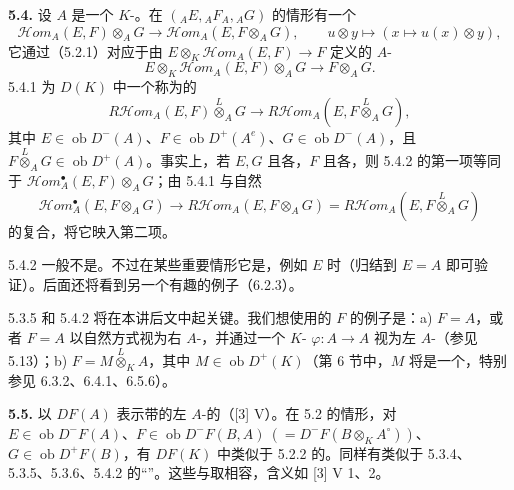 \textbf{5.4.} 设 $A$ 是一个 $K$-。在 $({}_AE,{}_AF_A,{}_AG)$ 的情形有一个
\begin{equation}\mathcal{H}\!om_A(E,F)\otimes_A G\longrightarrow\mathcal{H}\!om_A(E,F\otimes_A G),\qquad u\otimes y\longmapsto(x\longmapsto u(x)\otimes y),\tag{5.4.1}\end{equation}
它通过（5.2.1）对应于由 $E\otimes_K\mathcal{H}\!om_A(E,F)\to F$ 定义的 $A$-
\[E\otimes_K\mathcal{H}\!om_A(E,F)\otimes_A G\longrightarrow F\otimes_A G.\]
 5.4.1 为 $D(K)$ 中一个称为的
\begin{equation}R\mathcal{H}\!om_A(E,F)\overset L\otimes_A G\longrightarrow R\mathcal{H}\!om_A(E,F\overset L\otimes_A G),\tag{5.4.2}\end{equation}
其中 $E\in\operatorname{ob}D^-(A)$、$F\in\operatorname{ob}D^+(A^e)$、$G\in\operatorname{ob}D^-(A)$，且 $F\overset L\otimes_A G\in\operatorname{ob}D^+(A)$。事实上，若 $E,G$ 且各，$F$ 且各，则 5.4.2 的第一项等同于 $\mathcal{H}\!om_A^\bullet(E,F)\otimes_A G$；由 5.4.1 与自然
\[\mathcal{H}\!om_A^\bullet(E,F\otimes_A G)\longrightarrow R\mathcal{H}\!om_A(E,F\otimes_A G)=R\mathcal{H}\!om_A(E,F\overset L\otimes_A G)\]
的复合，将它映入第二项。

 5.4.2 一般不是。不过在某些重要情形它是，例如 $E$ 时（归结到 $E=A$ 即可验证）。后面还将看到另一个有趣的例子（6.2.3）。

 5.3.5 和 5.4.2 将在本讲后文中起关键。我们想使用的 $F$ 的例子是：a) $F=A$，或者 $F=A$ 以自然方式视为右 $A$-，并通过一个 $K$- $\varphi:A\to A$ 视为左 $A$-（参见 5.13）；b) $F=M\overset L\otimes_K A$，其中 $M\in\operatorname{ob}D^+(K)$（第 6 节中，$M$ 将是一个，特别参见 6.3.2、6.4.1、6.5.6）。

\textbf{5.5.} 以 $DF(A)$ 表示带的左 $A$-的（[3] V）。在 5.2 的情形，对 $E\in\operatorname{ob}D^-F(A)$、$F\in\operatorname{ob}D^-F(B,A)\ (=D^-F(B\otimes_K A^\circ))$、$G\in\operatorname{ob}D^+F(B)$，有 $DF(K)$ 中类似于 5.2.2 的。同样有类似于 5.3.4、5.3.5、5.3.6、5.4.2 的“”。这些与取相容，含义如 [3] V 1、2。

